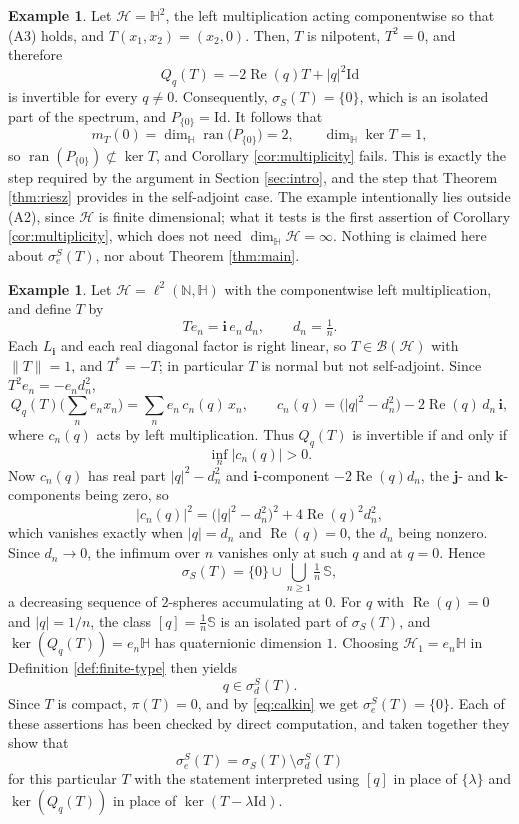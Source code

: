 \documentclass[12pt,a4paper]{article}
\theoremstyle{plain}
\theoremstyle{definition}
\newtheorem{example}[theorem]{Example}
\theoremstyle{remark}
\newcommand{\HH}{\mathbb H}
\newcommand{\NN}{\mathbb N}
\newcommand{\BB}{\mathcal B}
\newcommand{\Id}{\mathrm{Id}}
\newcommand{\HS}{\mathcal H}
\newcommand{\sphere}{\mathbb S}
\newcommand{\dimH}{\dim_{\HH}}
\newcommand{\sigS}{\sigma_S}
\newcommand{\sigeS}{\sigma_{e}^{S}}
\newcommand{\sigdS}{\sigma_{d}^{S}}
\DeclareMathOperator{\ran}{ran}
\DeclareMathOperator{\Rea}{Re}
\begin{document}
{\begin{example}
\label{ex:jordan}
Let $\HS=\HH^2$, the left multiplication acting componentwise so that
(A3) holds, and $T(x_1,x_2)=(x_2,0)$. Then, $T$ is nilpotent, $T^2=0$, and therefore
\[
Q_q(T)=-2\Rea(q)T+|q|^2\Id
\]
is invertible for every $q\neq0$. Consequently, $\sigS(T)=\{0\}$, which is an isolated part of the spectrum, and $P_{\{0\}}=\Id$. It follows that
\[
 m_T(0)=\dimH\ran\big(P_{\{0\}}\big)=2,
 \qquad
 \dimH\ker T=1,
\]
so $\ran(P_{\{0\}})\not\subset\ker T$, and Corollary \ref{cor:multiplicity} fails. This is exactly the step required by the argument in Section \ref{sec:intro}, and the step that Theorem \ref{thm:riesz} provides in the self-adjoint case. The example intentionally lies outside (A2), since $\HS$ is finite dimensional; what it tests is the first assertion of Corollary \ref{cor:multiplicity}, which does not need $\dimH\HS=\infty$. Nothing is claimed here about $\sigeS(T)$, nor about Theorem \ref{thm:main}.
\end{example}
\begin{example}
\label{ex:sphere}
Let $\HS=\ell^2(\NN,\HH)$ with the componentwise left multiplication,
and define $T$ by
\[
 Te_n=\mathbf i\,e_n\,d_n,
 \qquad d_n=\tfrac1n .
\]
Each $L_{\mathbf i}$ and each real diagonal factor is right linear, so
$T\in\BB(\HS)$ with $\|T\|=1$, and $T^*=-T$; in particular $T$ is
normal but not self-adjoint. Since $T^2e_n=-e_nd_n^2$,
\[
 Q_q(T)\Big(\sum_n e_nx_n\Big)
 =\sum_n e_n\,c_n(q)\,x_n ,
 \qquad
 c_n(q)=\big(|q|^2-d_n^2\big)-2\Rea(q)\,d_n\,\mathbf i ,
\]
where $c_n(q)$ acts by left multiplication. Thus $Q_q(T)$ is
invertible if and only if $$\inf_n|c_n(q)|>0.$$ Now $c_n(q)$ has real
part $|q|^2-d_n^2$ and $\mathbf i$-component $-2\Rea(q)d_n$, the
$\mathbf j$- and $\mathbf k$-components being zero, so
\[
 |c_n(q)|^2=\big(|q|^2-d_n^2\big)^2+4\Rea(q)^2d_n^2 ,
\]
which vanishes exactly when $|q|=d_n$ and $\Rea(q)=0$, the $d_n$ being
nonzero. Since $d_n\to0$, the infimum over $n$ vanishes only at such
$q$ and at $q=0$. Hence
\[
 \sigS(T)=\{0\}\cup\bigcup_{n\ge1}\tfrac1n\,\sphere ,
\]
a decreasing sequence of $2$-spheres accumulating at $0$. For
$q$ with $\Rea(q)=0$ and $|q|=1/n$, the class $[q]=\frac1n\sphere$ is
an isolated part of $\sigS(T)$, and $\ker(Q_q(T))=e_n\HH$ has
quaternionic dimension $1.$ Choosing $\HS_1=e_n\HH$ in Definition
\ref{def:finite-type} then yields $$q\in\sigdS(T).$$ Since $T$ is
compact, $\pi(T)=0$, and by \eqref{eq:calkin} we get
$\sigeS(T)=\{0\}$. Each of these assertions has been checked by direct
computation, and taken together they show that
$$\sigeS(T)=\sigS(T)\setminus\sigdS(T)$$ for this particular $T$ 
with the statement interpreted using $[q]$ in place of
$\{\lambda\}$ and $\ker(Q_q(T))$ in place of
$\ker(T-\lambda\Id)$.


\end{example}}
\end{document}

